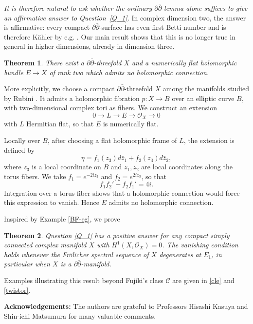 \documentclass[11pt]{amsart}
\newcommand{\ddbar}{\partial\bar\partial}
\numberwithin{equation}{section}
\newtheorem{bigthm}{Theorem}
\theoremstyle{definition}
\theoremstyle{plain}
\theoremstyle{plain}
\theoremstyle{definition}
\theoremstyle{stepstyle}
\begin{document}
	
	\textit{It is therefore natural to ask whether the ordinary
		$\ddbar$-lemma alone suffices to give an affirmative answer
		to Question~\ref{Q_1}.}
	In complex dimension two, the answer is affirmative:
	every compact $\ddbar$-surface has even first Betti number
	and is therefore K\"ahler by e.g. \cite[Theorem~11]{Buchdahl}.
	Our main result shows that this is no longer true in general
	in higher dimensions, already in dimension three.
	
	\begin{bigthm}\label{thm:main}
		There exist a $\ddbar$-threefold $X$  and a numerically flat holomorphic bundle $E\rightarrow X$
		of rank two which admits no holomorphic connection.
	\end{bigthm}
	
	
	
	More explicitly, we choose a compact $\partial\bar\partial$-threefold
	$X$ among the manifolds studied by Rubini \cite[\S2.3]{Rubini}.
	It admits a holomorphic fibration $p:X\to B$ over an elliptic curve
	$B$, with two-dimensional complex tori as fibers.
	We construct an extension
	$$0\longrightarrow L\longrightarrow E \longrightarrow \mathcal O_X\longrightarrow  0$$ with $L$ Hermitian flat,
	so that $E$ is numerically flat.
	
	Locally over $B$, after choosing a flat holomorphic frame of $L$,
	the extension is defined by
	$$
	\eta=f_1(z_3)d\bar z_1+f_2(z_3)d\bar z_2,
	$$
	where $z_3$ is a local coordinate on $B$ and $z_1,z_2$ are
	local coordinates along the torus fibers.
	We take $f_1=e^{-2iz_3}$ and $f_2=e^{2iz_3}$, so that
	$$
	f_1f_2'-f_2f_1'=4i.
	$$
	Integration over a torus fiber shows that a holomorphic connection
	would force this expression to vanish.
	Hence $E$ admits no holomorphic connection.
	
	\medskip
	\medskip
	Inspired by Example \ref{BF-eg}, we prove
	\begin{bigthm}
		\label{thm:simply-connected}
		Question \ref{Q_1} has a positive answer for any compact
		simply connected complex manifold $X$ with
		$H^1(X,\mathcal O_X)=0$.
		The vanishing condition holds whenever the Fr\"olicher spectral
		sequence of $X$ degenerates at $E_1$, in particular when $X$
		is a $\ddbar$-manifold.
	\end{bigthm} 
	
	Examples illustrating this result beyond Fujiki's class
	$\mathcal C$ are given in \ref{cle} and \ref{twistor}.
	
	\vspace{.5cm}
	\noindent\textbf{Acknowledgements:}
	The authors are grateful to Professors Hisashi Kasuya and Shin-ichi Matsumura  for many valuable comments. 
	
\end{document}
